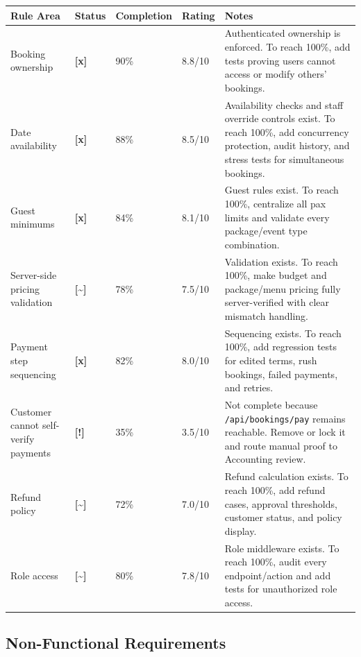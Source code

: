 \documentclass[11pt,a4paper]{article}
\newcommand{\statusdone}{\textbf{[x]}}
\newcommand{\statuspartial}{\textbf{[{\textasciitilde}]}}
\newcommand{\statusrisk}{\textbf{[!]}}
\begin{document}
\begin{longtable}{L{0.24\textwidth} C{0.08\textwidth} C{0.10\textwidth} C{0.10\textwidth} L{0.36\textwidth}}
\toprule
\textbf{Rule Area} & \textbf{Status} & \textbf{Completion} & \textbf{Rating} & \textbf{Notes} \\
\midrule
Booking ownership & \statusdone & 90\% & 8.8/10 & Authenticated ownership is enforced. To reach 100\%, add tests proving users cannot access or modify others' bookings. \\
Date availability & \statusdone & 88\% & 8.5/10 & Availability checks and staff override controls exist. To reach 100\%, add concurrency protection, audit history, and stress tests for simultaneous bookings. \\
Guest minimums & \statusdone & 84\% & 8.1/10 & Guest rules exist. To reach 100\%, centralize all pax limits and validate every package/event type combination. \\
Server-side pricing validation & \statuspartial & 78\% & 7.5/10 & Validation exists. To reach 100\%, make budget and package/menu pricing fully server-verified with clear mismatch handling. \\
Payment step sequencing & \statusdone & 82\% & 8.0/10 & Sequencing exists. To reach 100\%, add regression tests for edited terms, rush bookings, failed payments, and retries. \\
Customer cannot self-verify payments & \statusrisk & 35\% & 3.5/10 & Not complete because \texttt{/api/bookings/pay} remains reachable. Remove or lock it and route manual proof to Accounting review. \\
Refund policy & \statuspartial & 72\% & 7.0/10 & Refund calculation exists. To reach 100\%, add refund cases, approval thresholds, customer status, and policy display. \\
Role access & \statuspartial & 80\% & 7.8/10 & Role middleware exists. To reach 100\%, audit every endpoint/action and add tests for unauthorized role access. \\
\bottomrule
\end{longtable}

\subsection{Non-Functional Requirements}
\end{document}
